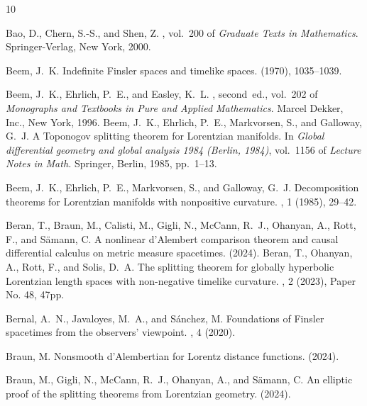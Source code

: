 \documentclass[a4paper,11pt]{article}
\numberwithin{equation}{section}
\theoremstyle{definition}
\theoremstyle{plain}
\begin{document}
\begin{thebibliography}{10}
	
	{\sc Bao, D., Chern, S.-S., and Shen, Z.}
	, vol.~200 of
	{\em Graduate Texts in Mathematics}.
	\newblock Springer-Verlag, New York, 2000.
	
	{\sc Beem, J.~K.}
	\newblock Indefinite {F}insler spaces and timelike spaces.
	 (1970), 1035--1039.
	
	{\sc Beem, J.~K., Ehrlich, P.~E., and Easley, K.~L.}
	, second~ed., vol.~202 of {\em
		Monographs and Textbooks in Pure and Applied Mathematics}.
	\newblock Marcel Dekker, Inc., New York, 1996.
	{\sc Beem, J.~K., Ehrlich, P.~E., Markvorsen, S., and Galloway, G.~J.}
	\newblock A {T}oponogov splitting theorem for {L}orentzian manifolds.
	\newblock In {\em Global differential geometry and global analysis 1984
		({B}erlin, 1984)}, vol.~1156 of {\em Lecture Notes in Math.} Springer,
	Berlin, 1985, pp.~1--13.

	{\sc Beem, J.~K., Ehrlich, P.~E., Markvorsen, S., and Galloway, G.~J.}
	\newblock Decomposition theorems for {L}orentzian manifolds with nonpositive
	curvature.
	, 1 (1985), 29--42.
    
	{\sc Beran, T., Braun, M., Calisti, M., Gigli, N., McCann, R.~J., Ohanyan, A.,
		Rott, F., and S{\"a}mann, C.}
	\newblock A nonlinear d'{Alembert} comparison theorem and causal differential
	calculus on metric measure spacetimes.
	 (2024).
	{\sc Beran, T., Ohanyan, A., Rott, F., and Solis, D.~A.}
	\newblock The splitting theorem for globally hyperbolic {L}orentzian length
	spaces with non-negative timelike curvature.
	, 2 (2023), Paper No. 48, 47pp.
	
	{\sc Bernal, A.~N., Javaloyes, M.~A., and Sánchez, M.}
	\newblock Foundations of {F}insler spacetimes from the observers’ viewpoint.
	, 4 (2020).
	
	{\sc Braun, M.}
	\newblock Nonsmooth d'{Alembertian} for {Lorentz} distance functions.
	 (2024).
	
	{\sc Braun, M., Gigli, N., McCann, R.~J., Ohanyan, A., and S{\"a}mann, C.}
	\newblock An elliptic proof of the splitting theorems from {Lorentzian}
	geometry.
	 (2024).
	

\end{thebibliography}
\end{document}

